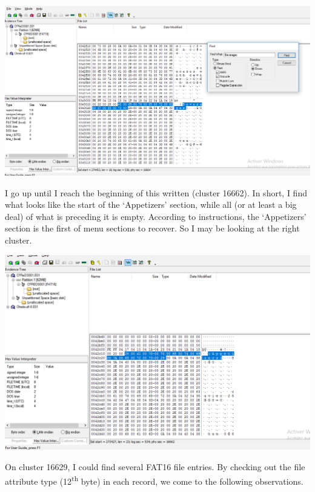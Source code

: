 \documentclass[
	12pt, %
]{fphw}
\begin{document}
\begin{center}
	\includegraphics[width=0.9\columnwidth]{fig3.png}
	\label{fig:fig3}
\end{center}
\vspace{2mm}

I go up until I reach the beginning of this written (cluster 16662). In short, I find what looks like the
start of the ‘Appetizers’ section, while all (or at least a big deal) of what is preceding it is empty.
According to instructions, the ‘Appetizers’ section is the first of menu sections to recover. So I may be
looking at the right cluster.\\

\begin{center}
	\includegraphics[width=0.9\columnwidth]{fig4.png}
	\label{fig:fig4}
\end{center}
\vspace{2mm}

On cluster 16629, I could find several FAT16 file entries. By checking out the file attribute type (12\textsuperscript{th}
byte) in each record, we come to the following observations.\\
\end{document}
